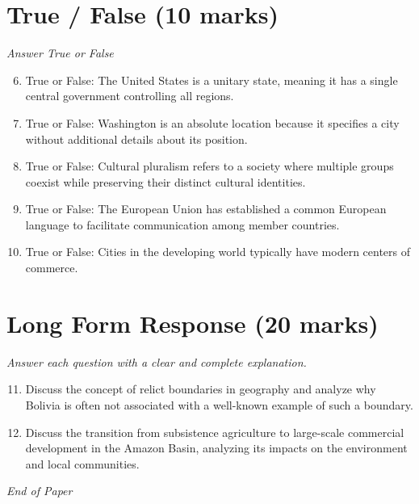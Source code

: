 \documentclass[12pt]{article}
\begin{document}
\section*{True / False (10 marks)}
\textit{Answer True or False}
\begin{enumerate}[label=\arabic*.]
\setcounter{enumi}{5}
\item True or False: The United States is a unitary state, meaning it has a single central government controlling all regions.
\item True or False: Washington is an absolute location because it specifies a city without additional details about its position.
\item True or False: Cultural pluralism refers to a society where multiple groups coexist while preserving their distinct cultural identities.
\item True or False: The European Union has established a common European language to facilitate communication among member countries.
\item True or False: Cities in the developing world typically have modern centers of commerce.
\end{enumerate}

\section*{Long Form Response (20 marks)}
\textit{Answer each question with a clear and complete explanation.}
\begin{enumerate}[label=\arabic*.]
\setcounter{enumi}{10}
\item Discuss the concept of relict boundaries in geography and analyze why Bolivia is often not associated with a well-known example of such a boundary.
\item Discuss the transition from subsistence agriculture to large-scale commercial development in the Amazon Basin, analyzing its impacts on the environment and local communities.
\end{enumerate}

\vfill
\noindent\textit{End of Paper}
\end{document}
